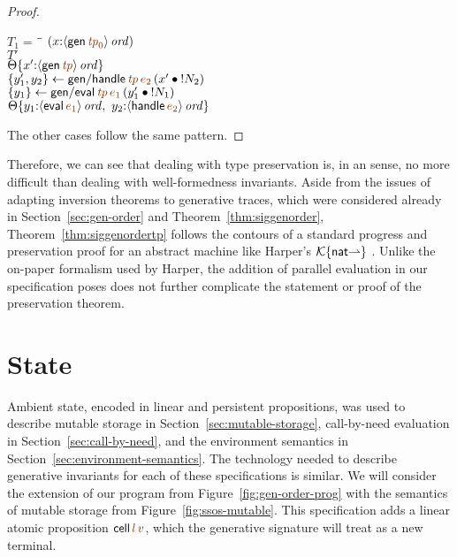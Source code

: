 \begin{proof}
\begin{description}
\begin{tabbing}
$T_1 = ~$ \= \qquad \= $(x{:}\istrue{\susp{{\sf gen}\,\lf{{\it tp}_0}}})$
\\
\>$T'$
\\
\>\>$\tackon{\Theta}{x'{:}\istrue{\susp{{\sf gen}\,\lf{{\it tp}}}}}$
\\
\>$\trstep{y_1',y_2}{{\sf gen/handle}\,\lf{\it tp}\,\lf{e_2}\,(\tfuser{x'}{\tbangr{N_2}})}$
\\
\>$\trstep{y_1}{{\sf gen/eval}\,\lf{\it tp}\,\lf{e_1}\,(\tfuser{y_1'}{\tbangr{N_1}})}$
\\
\>\>$\tackon{\Theta}{y_1{:}\istrue{\susp{{\sf eval}\,\lf{e_1}}}, ~
                   y_2{:}\istrue{\susp{{\sf handle}\,\lf{e_2}}}}$
\end{tabbing}


\end{description}

\noindent
The other cases follow the same pattern.
\end{proof}

Therefore, we can see that dealing with type preservation is, in an
sense, no more difficult than dealing with well-formedness
invariants. Aside from the issues of adapting inversion theorems to
generative traces, which were considered already in
Section~\ref{sec:gen-order} and Theorem~\ref{thm:siggenorder},
Theorem~\ref{thm:siggenordertp} follows the contours of a standard
progress and preservation proof for an abstract machine like Harper's
$\mathcal K\{{\sf nat}{\rightharpoonup}\}$ \cite[Chapter
27]{harper12practical}.  Unlike the on-paper formalism used by Harper,
the addition of parallel evaluation in our specification poses does not
further complicate the statement or proof of the preservation theorem.


\section{State}
\label{sec:gen-state}

Ambient state, encoded in linear and persistent propositions, was used
to describe mutable storage in Section~\ref{sec:mutable-storage},
call-by-need evaluation in Section~\ref{sec:call-by-need}, and the
environment semantics in Section~\ref{sec:environment-semantics}. The
technology needed to describe generative invariants for each of these
specifications is similar. We will consider the extension of our
program from Figure~\ref{fig:gen-order-prog} with the semantics of
mutable storage from Figure~\ref{fig:ssos-mutable}. This specification
adds a linear atomic proposition ${\sf cell}\,\lf{l}\,\lf{v}$, which
the generative signature will treat as a new terminal.

